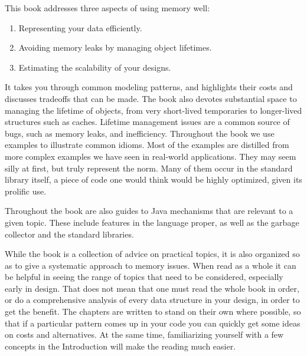 This book addresses three aspects of using memory well: 
\begin{enumerate}
	\item Representing your data efficiently.
	\item Avoiding memory leaks by managing object lifetimes.
	\item Estimating the scalability of your designs.
\end{enumerate}
It takes you through common modeling
patterns, and highlights their costs and discusses tradeoffs that can be made.
The book also devotes substantial space to managing the lifetime of objects,
from very short-lived temporaries to longer-lived structures such as caches.
Lifetime management issues are a common source of bugs, such as memory leaks,
and inefficiency.  Throughout the book we use examples to illustrate common
idioms. Most of the examples are distilled from more complex examples we have
seen in real-world applications. They may seem silly at first, but truly
represent the norm. Many of them occur in the standard library itself, a piece
of code one would think would be highly optimized, given its prolific use.

Throughout the book are also guides to Java mechanisms that are relevant to a
given topic.  These include features in the language proper, as well as the
garbage collector and the standard libraries.

While the book is a collection of advice on practical topics, it is also
organized so as to give a systematic approach to memory issues. When read as a
whole it can be helpful in seeing the range of topics that need to be
considered, especially early in design. That does not mean that one must read
the whole book in order, or do a comprehensive analysis of every data structure
in your design, in order to get the benefit. The chapters are written to stand
on their own where possible, so that if a particular pattern comes up in your
code you can quickly get some ideas on costs and alternatives. At the same time,
familiarizing yourself with a few concepts in the Introduction will make the
reading much easier.




